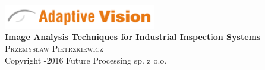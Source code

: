 \newcommand{\coverPage}[3]
{
	\begin{titlingpage}
	\begin{center}


	\includegraphics[width=0.50\textwidth]{./logo}\\[5cm]    





	{ \huge \bfseries #2}\\[0.4cm]

	\textsc{\Large #1}\\[0.5cm]
	\null
	\vfill
	{\small #3}
	\end{center}
	\end{titlingpage}



	\thispagestyle{empty}	
	\newpage
}


\coverPage
{Przemys\l aw Pietrzkiewicz}
{Image Analysis Techniques for Industrial Inspection Systems}
{Copyright \textcopyright 2012-2016 Future Processing sp. z o.o.}
